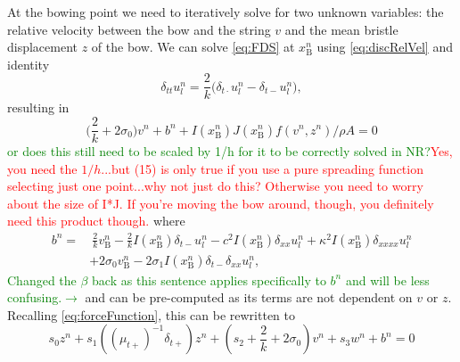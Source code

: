 \documentclass[twoside,a4paper,dvipsnames]{article}
\def\SBcomment[#1]{\textcolor{Red}{#1}}
\def\SWcomment[#1]{\textcolor{Green}{#1}}
\begin{document}
At the bowing point we need to iteratively solve for two unknown variables: the relative velocity between the bow and the string $v$ and the mean bristle displacement $z$ of the bow.
We can solve \eqref{eq:FDS} at $x_\text{B}^n$ using \eqref{eq:discRelVel} and identity \cite{Bilbao2009}
\begin{equation}
    \delta_{tt}u_l^n = \frac{2}{k}\big(\delta_{t\cdot}u_l^n-\delta_{t-}u_l^n\big),
\end{equation}
resulting in 
\begin{equation} \label{eq:incIdentity}
    \Big(\frac{2}{k}+2\sigma_{0}\Big) v^n +b^n+I(x_\text{B}^n)J(x_\text{B}^n)f(v^n,z^n)/\rho A = 0
\end{equation}
\SWcomment[or does this still need to be scaled by 1/h for it to be correctly solved in NR?]{}\SBcomment[Yes, you need the $1/h$...but (15) is only true if you use a pure spreading function selecting just one point...why not just do this? Otherwise you need to worry about the size of I*J. If you're moving the bow around, though, you definitely need this product though. ]where 
\begin{equation}
        \begin{aligned}b^n =& \: \frac{2}{k}v_\text{B}^n-\frac{2}{k}I(x_\text{B}^n)\delta_{t-}u_l^n - c^2 I(x_\text{B}^n)\delta_{xx} u_l^n +\kappa^2I(x_\text{B}^n)\delta_{xxxx} u_l^n \\
    &+ 2\sigma_0v_\text{B}^n -2\sigma_1I(x_\text{B}^n)\delta_{t-}\delta_{xx}u_l^n,
\end{aligned}
\end{equation}
\SWcomment[Changed the $\beta$ back as this sentence applies specifically to $b^n$ and will be less confusing.$\rightarrow$ ]and can be pre-computed as its terms are not dependent on $v$ or $z$. Recalling \eqref{eq:forceFunction}, this can be rewritten to
\begin{equation}\label{eq:newtonFunction}
    s_0z^n+s_1((\mu_{t+})^{-1}\delta_{t+}) z^n+(s_2 + \frac{2}{k} + 2\sigma_0)v^n+s_3w^n
    + b^n = 0
    \end{equation}
\end{document}
